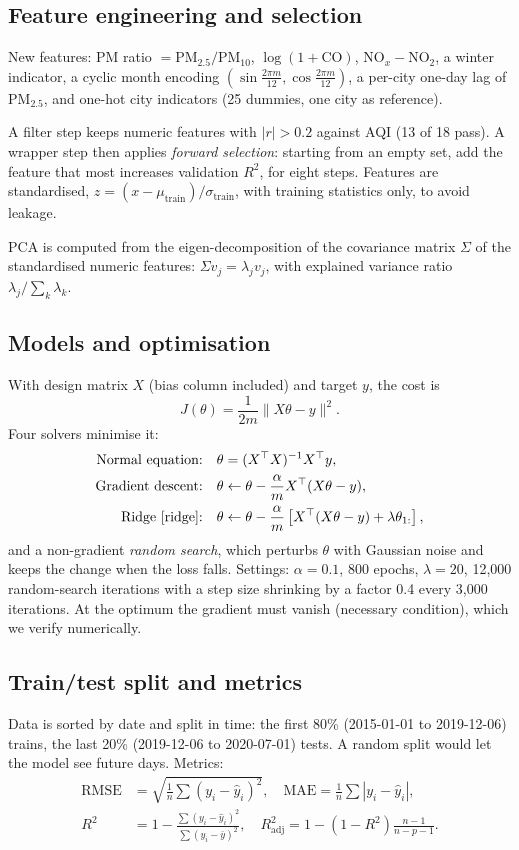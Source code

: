 \documentclass[11pt,a4paper]{article}
\begin{document}
\subsection{Feature engineering and selection}
New features: PM ratio $=\mathrm{PM}_{2.5}/\mathrm{PM}_{10}$, $\log(1+\mathrm{CO})$, $\mathrm{NO}_x-\mathrm{NO}_2$, a winter indicator, a cyclic month encoding $(\sin\frac{2\pi m}{12},\cos\frac{2\pi m}{12})$, a per-city one-day lag of PM$_{2.5}$, and one-hot city indicators (25 dummies, one city as reference).

A filter step keeps numeric features with $|r|>0.2$ against AQI (13 of 18 pass). A wrapper step then applies \emph{forward selection}: starting from an empty set, add the feature that most increases validation $R^2$, for eight steps. Features are standardised, $z=(x-\mu_{\text{train}})/\sigma_{\text{train}}$, with training statistics only, to avoid leakage.

PCA is computed from the eigen-decomposition of the covariance matrix $\Sigma$ of the standardised numeric features: $\Sigma v_j=\lambda_j v_j$, with explained variance ratio $\lambda_j/\sum_k\lambda_k$.

\subsection{Models and optimisation}
With design matrix $X$ (bias column included) and target $y$, the cost is
\begin{equation}
J(\theta)=\frac{1}{2m}\lVert X\theta-y\rVert^2 .
\end{equation}
Four solvers minimise it:
\begin{align}
\text{Normal equation:}&\quad \theta=(X^\top X)^{-1}X^\top y,\\
\text{Gradient descent:}&\quad \theta\leftarrow\theta-\frac{\alpha}{m}X^\top(X\theta-y),\\
\text{Ridge \cite{ridge}:}&\quad \theta\leftarrow\theta-\frac{\alpha}{m}\left[X^\top(X\theta-y)+\lambda\theta_{1:}\right],
\end{align}
and a non-gradient \emph{random search}, which perturbs $\theta$ with Gaussian noise and keeps the change when the loss falls. Settings: $\alpha=0.1$, 800 epochs, $\lambda=20$, 12{,}000 random-search iterations with a step size shrinking by a factor 0.4 every 3{,}000 iterations. At the optimum the gradient must vanish (necessary condition), which we verify numerically.

\subsection{Train/test split and metrics}
Data is sorted by date and split in time: the first 80\% (2015-01-01 to 2019-12-06) trains, the last 20\% (2019-12-06 to 2020-07-01) tests. A random split would let the model see future days. Metrics:
\begin{align}
\mathrm{RMSE}&=\sqrt{\tfrac1n\sum(y_i-\hat y_i)^2}, \quad \mathrm{MAE}=\tfrac1n\sum|y_i-\hat y_i|,\\
R^2&=1-\frac{\sum(y_i-\hat y_i)^2}{\sum(y_i-\bar y)^2},\quad
R^2_{\text{adj}}=1-(1-R^2)\frac{n-1}{n-p-1}.
\end{align}
\end{document}
